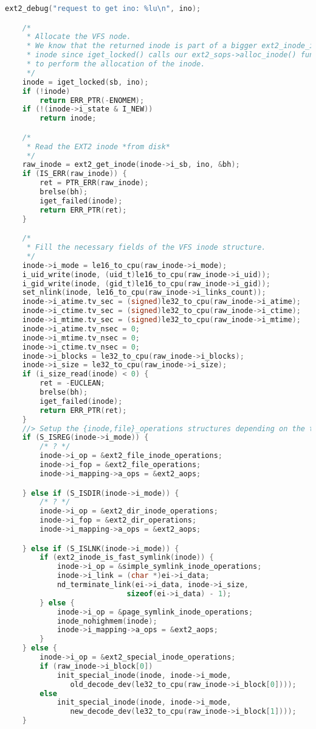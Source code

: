 \documentclass{article}
\begin{document}
\begin{enumerate}
\begin{lstlisting}[language=C]
	ext2_debug("request to get ino: %lu\n", ino);

	/*
	 * Allocate the VFS node.
	 * We know that the returned inode is part of a bigger ext2_inode_info
	 * inode since iget_locked() calls our ext2_sops->alloc_inode() function
	 * to perform the allocation of the inode.
	 */
	inode = iget_locked(sb, ino);
	if (!inode)
		return ERR_PTR(-ENOMEM);
	if (!(inode->i_state & I_NEW))
		return inode;

	/*
	 * Read the EXT2 inode *from disk*
	 */
	raw_inode = ext2_get_inode(inode->i_sb, ino, &bh);
	if (IS_ERR(raw_inode)) {
		ret = PTR_ERR(raw_inode);
		brelse(bh);
		iget_failed(inode);
		return ERR_PTR(ret);
	}

	/*
	 * Fill the necessary fields of the VFS inode structure.
	 */
	inode->i_mode = le16_to_cpu(raw_inode->i_mode);
	i_uid_write(inode, (uid_t)le16_to_cpu(raw_inode->i_uid));
	i_gid_write(inode, (gid_t)le16_to_cpu(raw_inode->i_gid));
	set_nlink(inode, le16_to_cpu(raw_inode->i_links_count));
	inode->i_atime.tv_sec = (signed)le32_to_cpu(raw_inode->i_atime);
	inode->i_ctime.tv_sec = (signed)le32_to_cpu(raw_inode->i_ctime);
	inode->i_mtime.tv_sec = (signed)le32_to_cpu(raw_inode->i_mtime);
	inode->i_atime.tv_nsec = 0;
	inode->i_mtime.tv_nsec = 0;
	inode->i_ctime.tv_nsec = 0;
	inode->i_blocks = le32_to_cpu(raw_inode->i_blocks);
	inode->i_size = le32_to_cpu(raw_inode->i_size);
	if (i_size_read(inode) < 0) {
		ret = -EUCLEAN;
		brelse(bh);
		iget_failed(inode);
		return ERR_PTR(ret);
	}
	//> Setup the {inode,file}_operations structures depending on the type.
	if (S_ISREG(inode->i_mode)) {
		/* ? */
        inode->i_op = &ext2_file_inode_operations;
        inode->i_fop = &ext2_file_operations;
        inode->i_mapping->a_ops = &ext2_aops;

	} else if (S_ISDIR(inode->i_mode)) {
		/* ? */
        inode->i_op = &ext2_dir_inode_operations;
        inode->i_fop = &ext2_dir_operations;
        inode->i_mapping->a_ops = &ext2_aops;

	} else if (S_ISLNK(inode->i_mode)) {
		if (ext2_inode_is_fast_symlink(inode)) {
			inode->i_op = &simple_symlink_inode_operations;
			inode->i_link = (char *)ei->i_data;
			nd_terminate_link(ei->i_data, inode->i_size,
                            sizeof(ei->i_data) - 1);
		} else {
			inode->i_op = &page_symlink_inode_operations;
			inode_nohighmem(inode);
			inode->i_mapping->a_ops = &ext2_aops;
		}
	} else {
		inode->i_op = &ext2_special_inode_operations;
		if (raw_inode->i_block[0])
			init_special_inode(inode, inode->i_mode,
			   old_decode_dev(le32_to_cpu(raw_inode->i_block[0])));
		else 
			init_special_inode(inode, inode->i_mode,
			   new_decode_dev(le32_to_cpu(raw_inode->i_block[1])));
	}


\end{lstlisting}
\end{enumerate}
\end{document}
